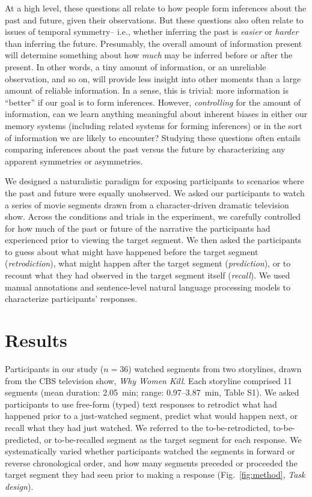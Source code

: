 \documentclass[10pt]{article}
\newcommand{\stimDescription}{S1} %
\begin{document}
At a high level, these questions all relate to how people form inferences about the past and future, given their observations.  But these questions also often relate to issues of temporal symmetry-- i.e., whether inferring the past is \textit{easier} or \textit{harder} than inferring the future.  Presumably, the overall amount of information present will determine something about how \textit{much} may be inferred before or after the present.  In other words, a tiny amount of information, or an unreliable observation, and so on, will provide less insight into other moments than a large amount of reliable information.  In a sense, this is trivial: more information is ``better'' if our goal is to form inferences.  However, \textit{controlling} for the amount of information, can we learn anything meaningful about inherent biases in either our memory systems (including related systems for forming inferences) or in the sort of information we are likely to encounter?  Studying these questions often entails comparing inferences about the past versus the future by characterizing any apparent symmetries or asymmetries.

We designed a naturalistic paradigm for exposing participants to scenarios where the past and future were equally unobserved.  We asked our participants to watch a series of movie segments drawn from a character-driven dramatic television show.  Across the conditions and trials in the experiment, we carefully controlled for how much of the past or future of the narrative the participants had experienced prior to viewing the target segment.  We then asked the participants to guess about what might have happened before the target segment (\textit{retrodiction}), what might happen after the target segment (\textit{prediction}), or to recount what they had observed in the target segment itself (\textit{recall}).  We used manual annotations and sentence-level natural language processing models to characterize participants' responses.

\section*{Results}
Participants in our study ($n = 36$) watched segments from two storylines, drawn from the CBS television show, \textit{Why Women Kill}.  Each storyline comprised 11 segments (mean duration: 2.05~min; range: 0.97--3.87~min, Table \stimDescription).  We asked participants to use free-form (typed) text responses to retrodict what had happened prior to a just-watched segment, predict what would happen next, or recall what they had just watched. We referred to the to-be-retrodicted, to-be-predicted, or to-be-recalled segment as the target segment for each response. We systematically varied whether participants watched the segments in forward or reverse chronological order, and how many segments preceded or proceeded the target segment they had seen prior to making a response (Fig.~\ref{fig:method}, \textit{Task design}).
\end{document}
